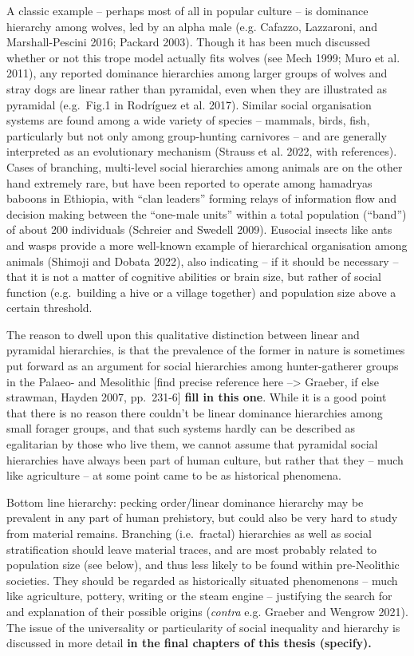 \documentclass[
  12pt,
]{book}
\begin{document}
A classic example -- perhaps most of all in popular culture -- is dominance hierarchy among wolves, led by an alpha male (e.g. Cafazzo, Lazzaroni, and Marshall-Pescini 2016; Packard 2003). Though it has been much discussed whether or not this trope model actually fits wolves (see Mech 1999; Muro et al. 2011), any reported dominance hierarchies among larger groups of wolves and stray dogs are linear rather than pyramidal, even when they are illustrated as pyramidal (e.g.~Fig.1 in Rodríguez et al. 2017). Similar social organisation systems are found among a wide variety of species -- mammals, birds, fish, particularly but not only among group-hunting carnivores -- and are generally interpreted as an evolutionary mechanism (Strauss et al. 2022, with references). Cases of branching, multi-level social hierarchies among animals are on the other hand extremely rare, but have been reported to operate among hamadryas baboons in Ethiopia, with ``clan leaders'' forming relays of information flow and decision making between the ``one-male units'' within a total population (``band'') of about 200 individuals (Schreier and Swedell 2009). Eusocial insects like ants and wasps provide a more well-known example of hierarchical organisation among animals (Shimoji and Dobata 2022), also indicating -- if it should be necessary -- that it is not a matter of cognitive abilities or brain size, but rather of social function (e.g.~building a hive or a village together) and population size above a certain threshold.

The reason to dwell upon this qualitative distinction between linear and pyramidal hierarchies, is that the prevalence of the former in nature is sometimes put forward as an argument for social hierarchies among hunter-gatherer groups in the Palaeo- and Mesolithic {[}find precise reference here --\textgreater{} Graeber, if else strawman, Hayden 2007, pp.~231-6{]} \textbf{fill in this one}. While it is a good point that there is no reason there couldn't be linear dominance hierarchies among small forager groups, and that such systems hardly can be described as egalitarian by those who live them, we cannot assume that pyramidal social hierarchies have always been part of human culture, but rather that they -- much like agriculture -- at some point came to be as historical phenomena.

Bottom line hierarchy: pecking order/linear dominance hierarchy may be prevalent in any part of human prehistory, but could also be very hard to study from material remains. Branching (i.e.~fractal) hierarchies as well as social stratification should leave material traces, and are most probably related to population size (see below), and thus less likely to be found within pre-Neolithic societies. They should be regarded as historically situated phenomenons -- much like agriculture, pottery, writing or the steam engine -- justifying the search for and explanation of their possible origins (\emph{contra} e.g. Graeber and Wengrow 2021). The issue of the universality or particularity of social inequality and hierarchy is discussed in more detail \textbf{in the final chapters of this thesis (specify).}
\end{document}
